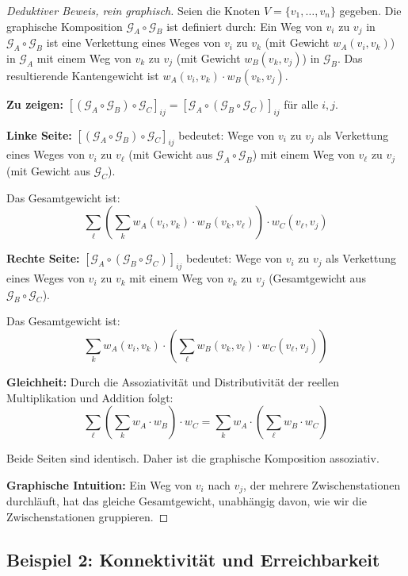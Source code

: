 \documentclass[12pt, a4paper]{article}
\theoremstyle{definition}
\theoremstyle{remark}
\newcommand{\Graph}{\mathcal{G}}
\begin{document}
\begin{proof}[Deduktiver Beweis, rein graphisch]
Seien die Knoten $V = \{v_1, \ldots, v_n\}$ gegeben. Die graphische Komposition $\Graph_A \circ \Graph_B$ ist definiert durch: Ein Weg von $v_i$ zu $v_j$ in $\Graph_A \circ \Graph_B$ ist eine Verkettung eines Weges von $v_i$ zu $v_k$ (mit Gewicht $w_A(v_i, v_k)$) in $\Graph_A$ mit einem Weg von $v_k$ zu $v_j$ (mit Gewicht $w_B(v_k, v_j)$) in $\Graph_B$. Das resultierende Kantengewicht ist $w_A(v_i, v_k) \cdot w_B(v_k, v_j)$.

\textbf{Zu zeigen:} $[(\Graph_A \circ \Graph_B) \circ \Graph_C]_{ij} = [\Graph_A \circ (\Graph_B \circ \Graph_C)]_{ij}$ für alle $i, j$.

\textbf{Linke Seite:} $[(\Graph_A \circ \Graph_B) \circ \Graph_C]_{ij}$ bedeutet: Wege von $v_i$ zu $v_j$ als Verkettung eines Weges von $v_i$ zu $v_\ell$ (mit Gewicht aus $\Graph_A \circ \Graph_B$) mit einem Weg von $v_\ell$ zu $v_j$ (mit Gewicht aus $\Graph_C$).

Das Gesamtgewicht ist:
\[
  \sum_{\ell} \left(\sum_{k} w_A(v_i, v_k) \cdot w_B(v_k, v_\ell)\right) \cdot w_C(v_\ell, v_j)
\]

\textbf{Rechte Seite:} $[\Graph_A \circ (\Graph_B \circ \Graph_C)]_{ij}$ bedeutet: Wege von $v_i$ zu $v_j$ als Verkettung eines Weges von $v_i$ zu $v_k$ mit einem Weg von $v_k$ zu $v_j$ (Gesamtgewicht aus $\Graph_B \circ \Graph_C$).

Das Gesamtgewicht ist:
\[
  \sum_{k} w_A(v_i, v_k) \cdot \left(\sum_{\ell} w_B(v_k, v_\ell) \cdot w_C(v_\ell, v_j)\right)
\]

\textbf{Gleichheit:} Durch die Assoziativität und Distributivität der reellen Multiplikation und Addition folgt:
\[
  \sum_{\ell} \left(\sum_{k} w_A \cdot w_B\right) \cdot w_C = \sum_{k} w_A \cdot \left(\sum_{\ell} w_B \cdot w_C\right)
\]

Beide Seiten sind identisch. Daher ist die graphische Komposition assoziativ.

\textbf{Graphische Intuition:} Ein Weg von $v_i$ nach $v_j$, der mehrere Zwischenstationen durchläuft, hat das gleiche Gesamtgewicht, unabhängig davon, wie wir die Zwischenstationen gruppieren.
\end{proof}

\subsection{Beispiel 2: Konnektivität und Erreichbarkeit}
\label{subsec:beispiel_konnektivitaet}
\end{document}
